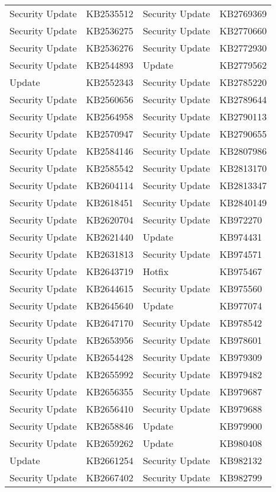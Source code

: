 \begin{longtable}{ l | l || l | l }
  Security Update  & KB2535512  & Security Update  & KB2769369  \\
  Security Update  & KB2536275  & Security Update  & KB2770660  \\
  Security Update  & KB2536276  & Security Update  & KB2772930  \\
  Security Update  & KB2544893  & Update           & KB2779562  \\
  Update           & KB2552343  & Security Update  & KB2785220  \\
  Security Update  & KB2560656  & Security Update  & KB2789644  \\
  Security Update  & KB2564958  & Security Update  & KB2790113  \\
  Security Update  & KB2570947  & Security Update  & KB2790655  \\
  Security Update  & KB2584146  & Security Update  & KB2807986  \\
  Security Update  & KB2585542  & Security Update  & KB2813170  \\
  Security Update  & KB2604114  & Security Update  & KB2813347  \\
  Security Update  & KB2618451  & Security Update  & KB2840149  \\
  Security Update  & KB2620704  & Security Update  & KB972270   \\
  Security Update  & KB2621440  & Update           & KB974431   \\
  Security Update  & KB2631813  & Security Update  & KB974571   \\
  Security Update  & KB2643719  & Hotfix           & KB975467   \\
  Security Update  & KB2644615  & Security Update  & KB975560   \\
  Security Update  & KB2645640  & Update           & KB977074   \\
  Security Update  & KB2647170  & Security Update  & KB978542   \\
  Security Update  & KB2653956  & Security Update  & KB978601   \\
  Security Update  & KB2654428  & Security Update  & KB979309   \\
  Security Update  & KB2655992  & Security Update  & KB979482   \\
  Security Update  & KB2656355  & Security Update  & KB979687   \\
  Security Update  & KB2656410  & Security Update  & KB979688   \\
  Security Update  & KB2658846  & Update           & KB979900   \\
  Security Update  & KB2659262  & Update           & KB980408   \\
  Update           & KB2661254  & Security Update  & KB982132   \\
  Security Update  & KB2667402  & Security Update  & KB982799   \\
\end{longtable}
